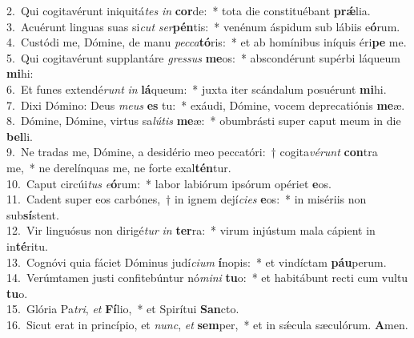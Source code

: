 {2.~}Qui cogitavérunt iniquitá\textit{tes} \textit{in} \textbf{cor}de:~* tota die constituébant \textbf{prǽ}lia.\\
{3.~}Acuérunt linguas suas si\textit{cut} \textit{ser}\textbf{pén}tis:~* venénum áspidum sub lábiis e\textbf{ó}rum.\\
{4.~}Custódi me, Dómine, de manu \textit{pec}\textit{ca}\textbf{tó}ris:~* et ab homínibus iníquis éri\textbf{pe} me.\\
{5.~}Qui cogitavérunt supplantáre \textit{gres}\textit{sus} \textbf{me}os:~* abscondérunt supérbi láqueum \textbf{mi}hi:\\
{6.~}Et funes extendé\textit{runt} \textit{in} \textbf{lá}queum:~* juxta iter scándalum posuérunt \textbf{mi}hi.\\
{7.~}Dixi Dómino: Deus \textit{me}\textit{us} \textbf{es} tu:~* exáudi, Dómine, vocem deprecatiónis \textbf{me}æ.\\
{8.~}Dómine, Dómine, virtus sa\textit{lú}\textit{tis} \textbf{me}æ:~* obumbrásti super caput meum in die \textbf{bel}li.\\
{9.~}Ne tradas me, Dómine, a desidério meo peccatóri:~† cogita\textit{vé}\textit{runt} \textbf{con}tra me,~* ne derelínquas me, ne forte exal\textbf{tén}tur.\\
{10.~}Caput circúi\textit{tus} \textit{e}\textbf{ó}rum:~* labor labiórum ipsórum opériet \textbf{e}os.\\
{11.~}Cadent super eos carbónes,~† in ignem dejí\textit{ci}\textit{es} \textbf{e}os:~* in misériis non sub\textbf{sí}stent.\\
{12.~}Vir linguósus non dirigé\textit{tur} \textit{in} \textbf{ter}ra:~* virum injústum mala cápient in in\textbf{té}ritu.\\
{13.~}Cognóvi quia fáciet Dóminus judí\textit{ci}\textit{um} \textbf{í}nopis:~* et vindíctam \textbf{páu}perum.\\
{14.~}Verúmtamen justi confitebúntur nó\textit{mi}\textit{ni} \textbf{tu}o:~* et habitábunt recti cum vultu \textbf{tu}o.\\
{15.~}Glória Pa\textit{tri}, \textit{et} \textbf{Fí}lio,~* et Spirítui \textbf{San}cto.\\
{16.~}Sicut erat in princípio, et \textit{nunc}, \textit{et} \textbf{sem}per,~* et in sǽcula sæculórum. \textbf{A}men.\\
